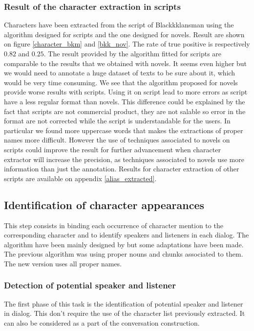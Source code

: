 \documentclass[a4paper, 12pt]{report}
\begin{document}
\subsubsection{Result of the character extraction in scripts}
Characters have been extracted from the script of Blackkklansman using the algorithm designed for scripts and the one designed for novels. 
Result are shown on figure \ref{character_bkm} and \ref{bkk_nov}. The rate of true positive is respectively $0.82$ and $0.25$. 
The result provided by the algorithm fitted for scripts are comparable to the results that we obtained with novels. 
It seems even higher but we would need to annotate a huge dataset of texts to be sure about it, which would be very time consuming.  
We see that the algorithm proposed for novels provide worse results with scripts. Using it on script lead to more errors as script have a less regular format than novels. 
This difference could be explained by the fact that scripts are not commercial product, they are not salable so error in the format are not corrected while the script is understandable for the users. 
In particular we found more uppercase words that makes the extractions of proper names more difficult. 
However the use of techniques associated to novels on scripts could improve the result for further advancement when character extractor will increase the precision, 
as techniques associated to novels use more information than just the annotation. Results for character extraction of other scripts are available on appendix \ref{alias_extracted}.\\


\subsection{Identification of character appearances}
\label{identification}
This step consists in binding each occurrence of character mention to the corresponding character and to identify speakers and listeners in each dialog. 
The algorithm have been mainly designed by \cite{original_thesis} but some adaptations have been made. 
The previous algorithm was using proper nouns and chunks associated to them. 
The new version uses all proper names.\\

\subsubsection{Detection of potential speaker and listener}
The first phase of this task is the identification of potential speaker and listener in dialog. This don't require the use of the character list previously extracted. It can also be considered as a part of the conversation construction.\\
\end{document}
